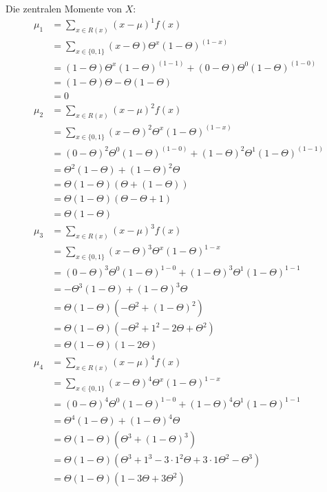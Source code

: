 \documentclass{article}
\begin{document}
Die zentralen Momente von $X$:
\begin{align*}
    \mu_1 &= \sum_{x \in R(x)} (x- \mu)^1 f(x) \\
    &= \sum_{x \in \{0,1\}} (x- \Theta) \Theta^x(1-\Theta)^{(1-x)} \\
    &= (1-\Theta) \Theta^x (1-\Theta)^{(1-1)}  + (0-\Theta) \Theta^0 (1-\Theta)^{(1-0)} \\
    &= (1-\Theta) \Theta - \Theta(1-\Theta) \\
    &= 0 \\ 
    \mu_2 &=  \sum_{x \in R(x)} (x- \mu)^2 f(x) \\
    &= \sum_{x \in \{0,1\}} (x- \Theta)^2 \Theta^x(1-\Theta)^{(1-x)} \\
    &= (0- \Theta)^2 \Theta^0(1-\Theta)^{(1-0)} + (1- \Theta)^2 \Theta^1(1-\Theta)^{(1-1)} \\
    &= \Theta^2(1-\Theta) + (1-\Theta)^2\Theta \\
    &= \Theta(1-\Theta)(\Theta + (1- \Theta)) \\
    &= \Theta(1- \Theta) (\Theta - \Theta + 1) \\
    &= \Theta(1- \Theta) \\
    \mu_3 &= \sum_{x \in R(x)} (x- \mu)^3 f(x) \\
    &= \sum_{x \in \{0,1\}} (x-\Theta)^3 \Theta^x(1-\Theta)^{1-x} \\
    &= (0-\Theta)^3 \Theta^0 (1-\Theta)^{1-0} + (1-\Theta)^3 \Theta^1 (1-\Theta)^{1-1} \\
    &= -\Theta^3 (1-\Theta) + (1-\Theta)^3 \Theta \\
    &= \Theta (1-\Theta)(-\Theta^2 + (1-\Theta)^2) \\
    &= \Theta (1-\Theta)(-\Theta^2 +1^2 - 2\Theta + \Theta^2) \\
    &= \Theta (1-\Theta)(1- 2\Theta) \\
    \mu_4 &= \sum_{x\in R(x)} (x- \mu)^4 f(x) \\
    &= \sum_{x \in \{0,1\}} (x-\Theta)^4 \Theta^x (1- \Theta)^{1-x} \\
    &= (0-\Theta)^4 \Theta^0 (1- \Theta)^{1-0} +  (1-\Theta)^4 \Theta^1 (1- \Theta)^{1-1} \\
    &= \Theta^4 (1-\Theta) + (1- \Theta)^4 \Theta \\
    &= \Theta(1- \Theta)(\Theta^3 + (1-\Theta)^3) \\
    &= \Theta(1- \Theta)(\Theta^3 +1^3 - 3 \cdot 1^2 \Theta + 3 \cdot 1 \Theta^2 - \Theta^3) \\
    &= \Theta(1- \Theta)(1 - 3 \Theta + 3 \Theta^2)
\end{align*}
\end{document}
